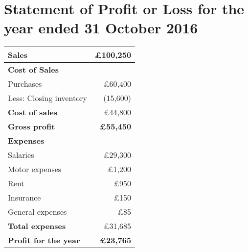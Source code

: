 
\section*{Statement of Profit or Loss for the year ended 31 October 2016}

\begin{tabular}{@{}l r@{}}
\toprule
Sales & £100{,}250 \\
\midrule
\textbf{Cost of Sales} & \\
\quad Purchases & £60{,}400 \\
\quad Less: Closing inventory & (15{,}600) \\
\textbf{Cost of sales} & £44{,}800 \\
\midrule
\textbf{Gross profit} & \textbf{£55{,}450} \\
\midrule
\textbf{Expenses} & \\
\quad Salaries & £29{,}300 \\
\quad Motor expenses & £1{,}200 \\
\quad Rent & £950 \\
\quad Insurance & £150 \\
\quad General expenses & £85 \\
\textbf{Total expenses} & £31{,}685 \\
\midrule
\textbf{Profit for the year} & \textbf{£23{,}765} \\
\bottomrule
\end{tabular}

